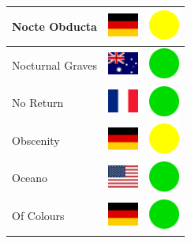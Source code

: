 \documentclass[12pt, a4paper, twoside]{report}
\begin{document}
\begin{center}
\begin{longtable}{|p{5cm}|p{2cm}|p{2cm}|}
Nocte Obducta & \includegraphics[width=1cm]{4x3/de} & \includegraphics[width=1cm]{likes/m} \\ \hline
Nocturnal Graves & \includegraphics[width=1cm]{4x3/au} & \includegraphics[width=1cm]{likes/y} \\ \hline
No Return & \includegraphics[width=1cm]{4x3/fr} & \includegraphics[width=1cm]{likes/y} \\ \hline
Obscenity & \includegraphics[width=1cm]{4x3/de} & \includegraphics[width=1cm]{likes/m} \\ \hline
Oceano & \includegraphics[width=1cm]{4x3/us} & \includegraphics[width=1cm]{likes/y} \\ \hline
Of Colours & \includegraphics[width=1cm]{4x3/de} & \includegraphics[width=1cm]{likes/y} \\ \hline

\end{longtable}
\end{center}
\end{document}
